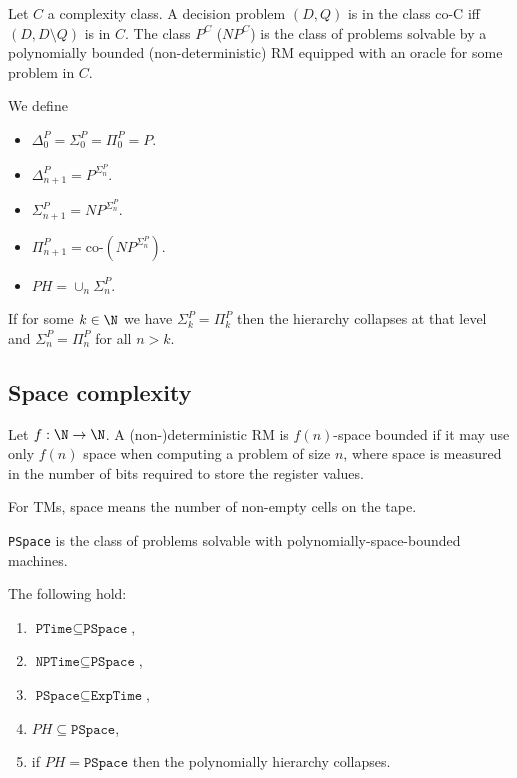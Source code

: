 \documentclass{article}
\begin{document}
\begin{definition*}
	Let $C$ a complexity class. A decision problem $(D,Q)$ is in the class
	co-C iff $(D, D\setminus Q)$ is in $C$. The class $P^C$ ($NP^C$) is the
	class of problems solvable by a polynomially bounded (non-deterministic)
	RM equipped with an oracle for some problem in $C$.

	We define
	\begin{itemize}
		\item $\Delta_0^P=\Sigma_0^P=\Pi_0^P=P$.
		\item $\Delta_{n+1}^P=P^{\Sigma_n^P}$.
		\item $\Sigma_{n+1}^P=NP^{\Sigma_n^P}$.
		\item $\Pi_{n+1}^P=\text{co-}\left(NP^{\Sigma_n^P}\right)$.
		\item $PH=\cup_n \Sigma_n^P$.
	\end{itemize}
\end{definition*}

\begin{theorem*}[II.26]
	If for some $k\in\N$ we have $\Sigma_k^P = \Pi_k^P$ then the hierarchy
	collapses at that level and $\Sigma_n^P = \Pi_n^P$ for all $n>k$.
\end{theorem*}

\subsection{Space complexity}

\begin{definition*}
	Let $f:\N\to\N$.
	A (non-)deterministic RM is $f(n)$-space bounded if it may use only $f(n)$
	space when computing a problem of size $n$, where space is measured in the
	number of bits required to store the register values.

	For TMs, space means the number of non-empty cells on the tape.

	\texttt{PSpace} is the class of problems solvable with polynomially-space-bounded
	machines.
\end{definition*}

\begin{theorem*}[II.28]
	The following hold:
	\begin{enumerate}
		\item $\texttt{PTime}\subseteq\texttt{PSpace}$,
		\item $\texttt{NPTime}\subseteq\texttt{PSpace}$,
		\item $\texttt{PSpace}\subseteq\texttt{ExpTime}$,
		\item $PH\subseteq\texttt{PSpace}$,
		\item if $PH=\texttt{PSpace}$ then the polynomially hierarchy collapses.
	\end{enumerate}
\end{theorem*}
\end{document}

